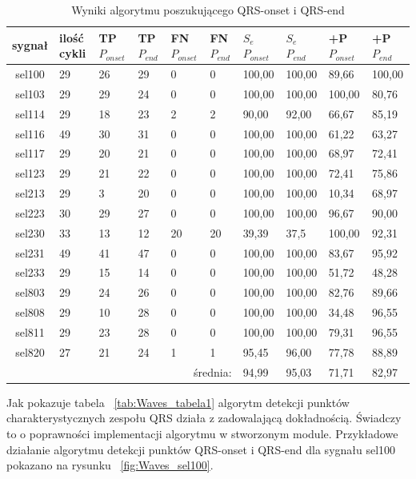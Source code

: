\begin{table}[!h]
\caption{Wyniki algorytmu poszukującego QRS-onset i QRS-end}
\label{tab:Waves_tabela2}
\begin{tabularx}{\textwidth}{|c|p{0.8cm}|X|X|X|p{0.7cm}|p{0.8cm}|p{0.8cm}|X|X|}
\hline
sygnał &
ilość  cykli &
TP $P_{onset}$ &
TP $P_{end}$ &
FN $P_{onset}$ &
FN $P_{end}$&
 $S_e$ $P_{onset}$ &
 $S_e$ $P_{end}$ &
+P  $P_{onset}$  &
+P  $P_{end}$ \\
\hline
sel100 &
29 &
26 &
29 &
0 &
0 &
100,00 &
100,00 &
89,66 &
100,00 \\
sel103 &
29 &
29 &
24 &
0 &
0 &
100,00 &
100,00 &
100,00  &
80,76 \\
sel114 &
29 &
18 &
23 &
2 &
2 &
90,00 &
92,00 &
66,67  &
85,19 \\
sel116 &
49 &
30 &
31 &
0 &
0 &
100,00 &
100,00 &
61,22  &
63,27 \\
sel117 &
29 &
20 &
21 &
0 &
0 &
100,00 &
100,00 &
68,97  &
72,41 \\
sel123 &
29 &
21 &
22 &
0 &
0 &
100,00 &
100,00 &
72,41  &
75,86 \\
sel213 &
29 &
3 &
20 &
0 &
0 &
100,00 &
100,00 &
10,34  &
68,97 \\
sel223 &
30 &
29 &
27 &
0 &
0 &
100,00 &
100,00 &
96,67  &
90,00 \\
sel230 &
33 &
13 &
12 &
20 &
20 &
39,39 &
37,5 &
100,00 &
92,31 \\
sel231 &
49 &
41 &
47 &
0 &
0 &
100,00 &
100,00 &
83,67  &
95,92 \\
sel233 &
29 &
15 &
14 &
0 &
0 &
100,00 &
100,00 &
51,72  &
48,28 \\
sel803 &
29 &
24 &
26 &
0 &
0 &
100,00 &
100,00 &
82,76  &
89,66 \\
sel808 &
29 &
10 &
28 &
0 &
0 &
100,00 &
100,00 &
34,48  &
96,55 \\
sel811 &
29 &
23 &
28 &
0 &
0 &
100,00 &
100,00 &
79,31  &
96,55 \\
sel820 &
27 &
21 &
24 &
1 &
1 &
95,45 &
96,00 &
77,78  &
88,89 \\
\hline \hline
\multicolumn{6}{|r|}{średnia:}   &
94,99 &
95,03 &
71,71 &
82,97 \\
\hline

\end{tabularx}
\end{table}

Jak pokazuje tabela ~\ref{tab:Waves_tabela1} algorytm detekcji punktów charakterystycznych zespołu QRS działa z zadowalającą dokładnością. Świadczy to o poprawności implementacji algorytmu w stworzonym module. Przykładowe działanie algorytmu detekcji punktów QRS-onset i QRS-end dla sygnału sel100 pokazano na rysunku ~\ref{fig:Waves_sel100}.

